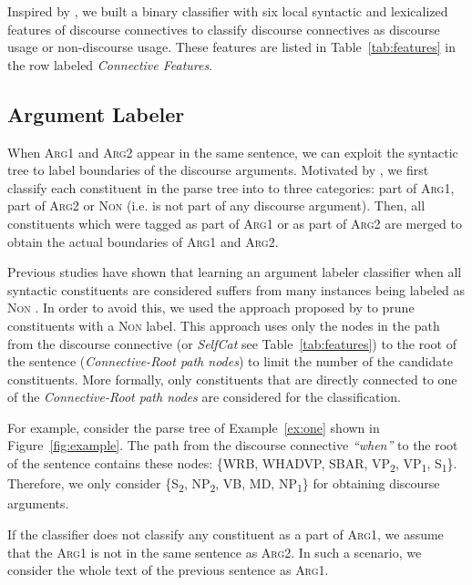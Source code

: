 \documentclass[11pt]{article}
\begin{document}
Inspired by \cite{pitler09-a}, we built a binary classifier with six local syntactic and lexicalized features of discourse connectives to classify discourse connectives as discourse usage or non-discourse usage. These features are listed in Table~\ref{tab:features} in the row labeled \textit{Connective Features}.

\subsection{Argument Labeler}

When \textsc{Arg1} and \textsc{Arg2} appear in the same sentence, we can exploit the syntactic tree to label boundaries of the discourse arguments. Motivated by \cite{lin14}, we first classify each constituent in the parse tree into to three categories: part of \textsc{Arg1}, part of \textsc{Arg2} or \textsc{Non} (i.e. is not part of any discourse argument). Then, all constituents which were tagged as part of \textsc{Arg1} or as part of \textsc{Arg2} are merged to obtain the actual boundaries of \textsc{Arg1} and \textsc{Arg2}.

Previous studies have shown that learning an argument labeler classifier when all syntactic constituents are considered suffers from many instances being labeled as \textsc{Non} \cite{kong14}. In order to avoid this, we used the approach proposed by  to prune constituents with a \textsc{Non} label. This approach uses only the nodes in the path from the discourse connective (or \textit{SelfCat} see Table~\ref{tab:features}) to the root of the sentence (\textit{Connective-Root path nodes}) to limit the number of the candidate constituents. More formally, only constituents that are directly connected to one of the \textit{Connective-Root path nodes} are considered for the classification.

For example, consider the parse tree of Example~\ref{ex:one} shown in Figure~\ref{fig:example}. The path from the discourse connective \textit{``when''} to the root of the sentence contains these nodes: \{WRB, WHADVP, SBAR, VP\textsubscript{2}, VP\textsubscript{1}, S\textsubscript{1}\}. Therefore, we only consider \{S\textsubscript{2}, NP\textsubscript{2}, VB, MD, NP\textsubscript{1}\} for obtaining discourse arguments.

If the classifier does not classify any constituent as a part of \textsc{Arg1}, we assume that the \textsc{Arg1} is not in the same sentence as \textsc{Arg2}. In such a scenario, we consider the whole text of the previous sentence as \textsc{Arg1}.
\end{document}
